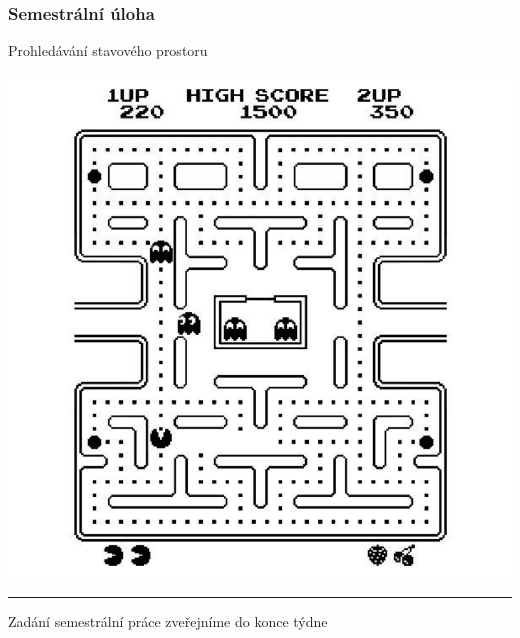 \documentclass[usenames,dvipsnames,9pt]{beamer}
\begin{document}
\begin{frame}
  \frametitle{Semestrální úloha}
  \begin{center}
    \Large Prohledávání stavového prostoru
  \end{center}
  
    \vspace{1em}
  
  \begin{center}
  \includegraphics[width=.4\linewidth]{figs/pacman2.pdf}
  \end{center}
  
%

  \vspace{2em}\pause

  \hrule
  \begin{center}
    Zadání semestrální práce zveřejníme do konce týdne
  \end{center}
\end{frame}

\framefeedback{}
\end{document}
